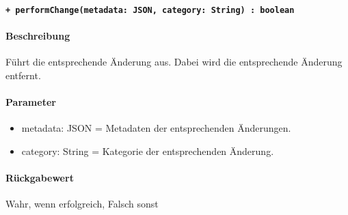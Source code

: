 \paragraph{\texttt{+ performChange(metadata: JSON, category: String) : boolean}}%
\paragraph*{Beschreibung}
Führt die entsprechende Änderung aus.
Dabei wird die entsprechende Änderung entfernt.
\paragraph*{Parameter}
\begin{itemize}
    \item metadata: JSON = Metadaten der entsprechenden Änderungen.
    \item category: String = Kategorie der entsprechenden Änderung.
\end{itemize}
\paragraph*{Rückgabewert}
Wahr, wenn erfolgreich, Falsch sonst
